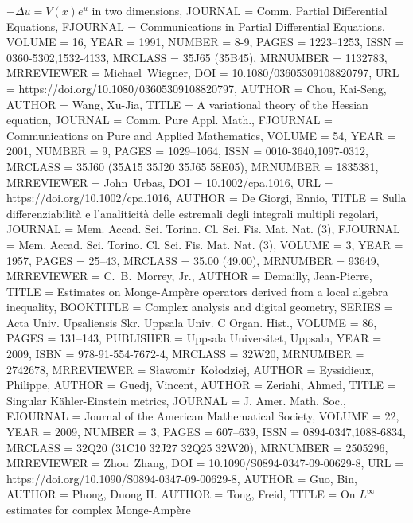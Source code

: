 \documentclass[11pt]{amsart}
\numberwithin{equation}{section}
\numberwithin{equation}{section}
\begin{document}
\begin{bibdiv}
\begin{biblist}
{{		{$-\Delta u=V(x)e^u$} in two dimensions},
	JOURNAL = {Comm. Partial Differential Equations},
	FJOURNAL = {Communications in Partial Differential Equations},
	VOLUME = {16},
	YEAR = {1991},
	NUMBER = {8-9},
	PAGES = {1223--1253},
	ISSN = {0360-5302,1532-4133},
	MRCLASS = {35J65 (35B45)},
	MRNUMBER = {1132783},
	MRREVIEWER = {Michael\ Wiegner},
	DOI = {10.1080/03605309108820797},
	URL = {https://doi.org/10.1080/03605309108820797},
}
 {
	AUTHOR = {Chou, Kai-Seng},
	AUTHOR = {Wang, Xu-Jia},
	TITLE = {A variational theory of the {H}essian equation},
	JOURNAL = {Comm. Pure Appl. Math.},
	FJOURNAL = {Communications on Pure and Applied Mathematics},
	VOLUME = {54},
	YEAR = {2001},
	NUMBER = {9},
	PAGES = {1029--1064},
	ISSN = {0010-3640,1097-0312},
	MRCLASS = {35J60 (35A15 35J20 35J65 58E05)},
	MRNUMBER = {1835381},
	MRREVIEWER = {John\ Urbas},
	DOI = {10.1002/cpa.1016},
	URL = {https://doi.org/10.1002/cpa.1016},
}
 {
	AUTHOR = {De Giorgi, Ennio},
	TITLE = {Sulla differenziabilit\`a{} e l'analiticit\`a{} delle
		estremali degli integrali multipli regolari},
	JOURNAL = {Mem. Accad. Sci. Torino. Cl. Sci. Fis. Mat. Nat. (3)},
	FJOURNAL = {Mem. Accad. Sci. Torino. Cl. Sci. Fis. Mat. Nat. (3)},
	VOLUME = {3},
	YEAR = {1957},
	PAGES = {25--43},
	MRCLASS = {35.00 (49.00)},
	MRNUMBER = {93649},
	MRREVIEWER = {C.\ B.\ Morrey, Jr.},
}
{AUTHOR = {Demailly, Jean-Pierre},
     TITLE = {Estimates on {M}onge-{A}mp\`ere operators derived from a local
              algebra inequality},
 BOOKTITLE = {Complex analysis and digital geometry},
    SERIES = {Acta Univ. Upsaliensis Skr. Uppsala Univ. C Organ. Hist.},
    VOLUME = {86},
     PAGES = {131--143},
 PUBLISHER = {Uppsala Universitet, Uppsala},
      YEAR = {2009},
      ISBN = {978-91-554-7672-4},
   MRCLASS = {32W20},
  MRNUMBER = {2742678},
MRREVIEWER = {S\l awomir\ Ko\l odziej},
}
 {
	AUTHOR = {Eyssidieux, Philippe},
	AUTHOR = {Guedj, Vincent},
	AUTHOR = {Zeriahi, Ahmed},
	TITLE = {Singular {K}\"ahler-{E}instein metrics},
	JOURNAL = {J. Amer. Math. Soc.},
	FJOURNAL = {Journal of the American Mathematical Society},
	VOLUME = {22},
	YEAR = {2009},
	NUMBER = {3},
	PAGES = {607--639},
	ISSN = {0894-0347,1088-6834},
	MRCLASS = {32Q20 (31C10 32J27 32Q25 32W20)},
	MRNUMBER = {2505296},
	MRREVIEWER = {Zhou\ Zhang},
	DOI = {10.1090/S0894-0347-09-00629-8},
	URL = {https://doi.org/10.1090/S0894-0347-09-00629-8},
}
 {
    AUTHOR = {Guo, Bin},  
    AUTHOR = {Phong, Duong H.}
    AUTHOR = {Tong, Freid},
     TITLE = {On {$L^\infty$} estimates for complex {M}onge-{A}mp\`ere
}}
\end{biblist}
\end{bibdiv}
\end{document}
